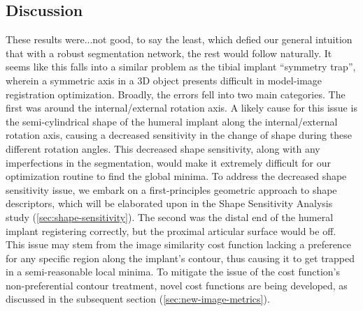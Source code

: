 \subsection{Discussion}
These results were...not good, to say the least, which defied our general intuition that with a robust segmentation network, the rest would follow naturally.
It seems like this falls into a similar problem as the tibial implant ``symmetry trap'', wherein a symmetric axis in a 3D object presents difficult in model-image registration optimization.
Broadly, the errors fell into two main categories.
The first was around the internal/external rotation axis.
A likely cause for this issue is the semi-cylindrical shape of the humeral implant along the internal/external rotation axis, causing a decreased sensitivity in the change of shape during these different rotation angles.
This decreased shape sensitivity, along with any imperfections in the segmentation, would make it extremely difficult for our optimization routine to find the global minima.
To address the decreased shape sensitivity issue, we embark on a first-principles geometric approach to shape descriptors, which will be elaborated upon in the Shape Sensitivity Analysis study (\cref{sec:shape-sensitivity}).
The second was the distal end of the humeral implant registering correctly, but the proximal articular surface would be off.
This issue may stem from the image similarity cost function lacking a preference for any specific region along the implant's contour, thus causing it to get trapped in a semi-reasonable local minima.
To mitigate the issue of the cost function's non-preferential contour treatment, novel cost functions are being developed, as discussed in the subsequent section (\cref{sec:new-image-metrics}).

